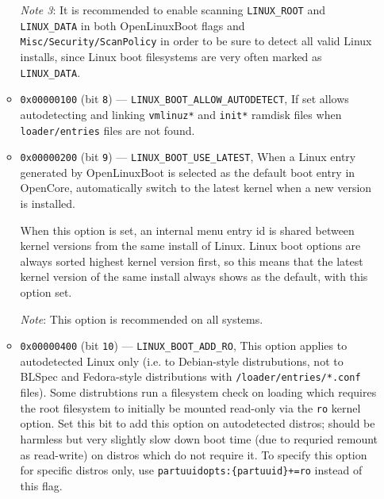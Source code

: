 \documentclass[]{article}
\begin{document}
\begin{itemize}
\begin{itemize}
	  \emph{Note 3}: It is recommended to enable scanning \texttt{LINUX\_ROOT} and \texttt{LINUX\_DATA}
    in both OpenLinuxBoot flags and \texttt{Misc/Security/ScanPolicy} in order to be sure to detect
    all valid Linux installs, since Linux boot filesystems are very often marked as \texttt{LINUX\_DATA}.
    \medskip

	  \item \texttt{0x00000100} (bit \texttt{8}) --- \texttt{LINUX\_BOOT\_ALLOW\_AUTODETECT},
	  If set allows autodetecting and linking \texttt{vmlinuz*} and \texttt{init*} ramdisk files
	  when \texttt{loader/entries} files are not found.
	  \item \texttt{0x00000200} (bit \texttt{9}) --- \texttt{LINUX\_BOOT\_USE\_LATEST},
	  When a Linux entry generated by OpenLinuxBoot is selected as the default boot entry
    in OpenCore, automatically switch to the latest kernel when a new version is installed. \medskip

	  When this option is set, an internal menu entry id is shared between kernel versions from the same install
    of Linux. Linux boot options are always sorted highest kernel version first, so this means that
    the latest kernel version of the same install always shows as the default, with this option set. \medskip

	  \emph{Note}: This option is recommended on all systems. \medskip

	  \item \texttt{0x00000400} (bit \texttt{10}) --- \texttt{LINUX\_BOOT\_ADD\_RO},
	  This option applies to autodetected Linux only (i.e. to Debian-style distrubutions, not to BLSpec and
    Fedora-style distributions with \texttt{/loader/entries/*.conf} files).
    Some distrubtions run a filesystem check on loading which requires the root
    filesystem to initially be mounted read-only via the \texttt{ro} kernel option. Set this bit to add this
    option on autodetected distros; should be harmless but very slightly slow down boot time (due to requried
    remount as read-write) on distros which do not require it. To specify this option for specific
    distros only, use \texttt{partuuidopts:\{partuuid\}+=ro} instead of this flag.


\end{itemize}
\end{itemize}
\end{document}
